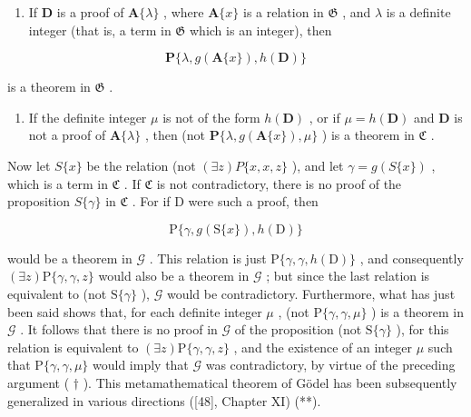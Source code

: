 \begin{enumerate}
\def\labelenumi{(\arabic{enumi})}
\tightlist
\item
  If \(\mathbf{D}\) is a proof of \(\mathbf{A}\{\lambda\}\) , where \(\mathbf{A}\{x\}\) is a relation in \(\mathfrak{G}\) , and \(\lambda\) is a definite integer (that is, a term in \(\mathfrak{G}\) which is an integer), then
\end{enumerate}

\[
\mathbf {P} \{\lambda , g (\mathbf {A} \{x \}), h (\mathbf {D}) \}
\]

is a theorem in \(\mathfrak{G}\) .

\begin{enumerate}
\def\labelenumi{(\arabic{enumi})}
\setcounter{enumi}{1}
\tightlist
\item
  If the definite integer \(\mu\) is not of the form \(h(\mathbf{D})\) , or if \(\mu = h(\mathbf{D})\) and \(\mathbf{D}\) is not a proof of \(\mathbf{A}\{\lambda\}\) , then (not \(\mathbf{P}\{\lambda, g(\mathbf{A}\{x\}), \mu\}\) ) is a theorem in \(\mathfrak{C}\) .
\end{enumerate}

Now let \(S\{x\}\) be the relation (not \((\exists z)P\{x, x, z\}\) ), and let \(\gamma = g(S\{x\})\) , which is a term in \(\mathfrak{C}\) . If \(\mathfrak{C}\) is not contradictory, there is no proof of the proposition \(S\{\gamma\}\) in \(\mathfrak{C}\) . For if D were such a proof, then

\[
\mathrm{P} \{\gamma , g (\mathrm{S} \{x \}), h (\mathrm{D}) \}
\]

would be a theorem in \(\mathcal{G}\) . This relation is just \(\mathrm{P}\{\gamma, \gamma, h(\mathrm{D})\}\) , and consequently \((\exists z)\mathrm{P}\{\gamma, \gamma, z\}\) would also be a theorem in \(\mathcal{G}\) ; but since the last relation is equivalent to (not \(\mathrm{S}\{\gamma\}\) ), \(\mathcal{G}\) would be contradictory. Furthermore, what has just been said shows that, for each definite integer \(\mu\) , (not \(\mathrm{P}\{\gamma, \gamma, \mu\}\) ) is a theorem in \(\mathcal{G}\) . It follows that there is no proof in \(\mathcal{G}\) of the proposition (not \(\mathrm{S}\{\gamma\}\) ), for this relation is equivalent to \((\exists z)\mathrm{P}\{\gamma, \gamma, z\}\) , and the existence of an integer \(\mu\) such that \(\mathrm{P}\{\gamma, \gamma, \mu\}\) would imply that \(\mathcal{G}\) was contradictory, by virtue of the preceding argument ( \(\dagger\) ). This metamathematical theorem of Gödel has been subsequently generalized in various directions ({[}48{]}, Chapter XI) (**).

